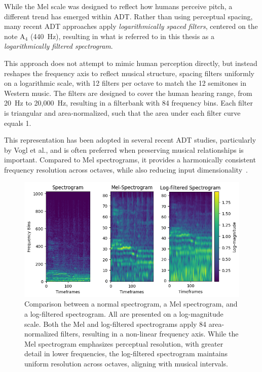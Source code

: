 While the Mel scale was designed to reflect how humans perceive pitch, a different trend has emerged within \acrfull{ADT}. Rather than using perceptual spacing, many recent \gls{ADT} approaches apply \textit{logarithmically spaced filters}, centered on the note $\text{A}_4$ (440~Hz), resulting in what is referred to in this thesis as a \textit{logarithmically filtered spectrogram}. 

This approach does not attempt to mimic human perception directly, but instead reshapes the frequency axis to reflect musical structure, spacing filters uniformly on a logarithmic scale, with 12 filters per octave to match the 12 semitones in Western music. The filters are designed to cover the human hearing range, from 20~Hz to 20,000~Hz, resulting in a filterbank with 84 frequency bins. Each filter is triangular and area-normalized, such that the area under each filter curve equals 1.

This representation has been adopted in several recent \gls{ADT} studies, particularly by Vogl et al., and is often preferred when preserving musical relationships is important. Compared to Mel spectrograms, it provides a harmonically consistent frequency resolution across octaves, while also reducing input dimensionality~\cite{Vogl2017DrumTV, vogl2018multiinstrumentdrumtranscription, jia2019deep, signals4040042, zehren2024analyzingreducingsynthetictorealtransfer}.

\begin{figure}[H]
    \centering
    \hspace*{-0.6cm}
    \includegraphics[scale=0.9]{figures/allspectrograms}
    \caption{Comparison between a normal spectrogram, a Mel spectrogram, and a log-filtered spectrogram. All are presented on a log-magnitude scale. Both the Mel and log-filtered spectrograms apply 84 area-normalized filters, resulting in a non-linear frequency axis. While the Mel spectrogram emphasizes perceptual resolution, with greater detail in lower frequencies, the log-filtered spectrogram maintains uniform resolution across octaves, aligning with musical intervals.}
    \label{AllSpectrogramFigure}
\end{figure}

